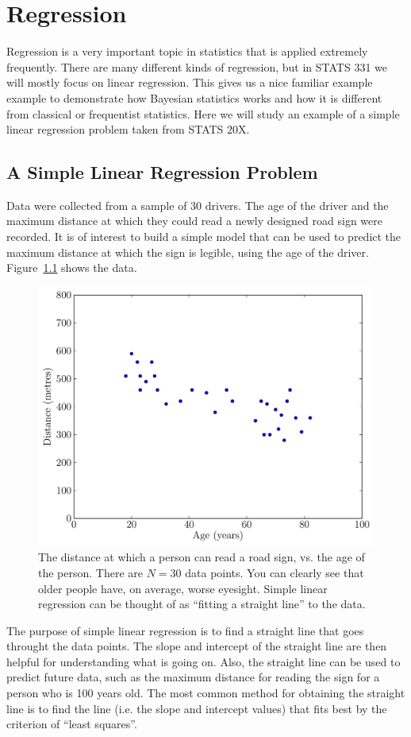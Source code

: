 \chapter{Regression}
Regression is a very important topic in statistics that is applied extremely
frequently. There are many different kinds of regression, but in STATS 331 we will
mostly focus on linear regression. This gives us a nice familiar example
example to demonstrate how Bayesian statistics works and how it is different
from classical or frequentist statistics. Here we will study an example of a
simple linear regression problem taken from STATS 20X.

\section{A Simple Linear Regression Problem}
Data were collected from a sample of 30 drivers. The age of the driver and the 
maximum distance at which they could read a newly designed road sign were 
recorded. It is of interest to build a simple model that can be used to predict the 
maximum distance at which the sign is legible, using the age of the driver.
Figure~\ref{fig:road} shows the data.
\begin{figure}
\begin{center}
\includegraphics[scale=0.5]{Figures/road.pdf}
\caption{The distance at which a person can read a road sign, vs. the age of
the person. There are $N=30$ data points. You can clearly see that older people
have, on average, worse eyesight. Simple linear regression can be thought of as
``fitting a straight line'' to the data.
\label{fig:road}}
\end{center}
\end{figure}
The purpose of simple linear regression is to find a straight line that goes
throught the data points. The slope and intercept of the straight line are then
helpful for understanding what is going on. Also, the straight line can be used
to predict future data, such as the maximum distance for reading the sign for a
person who is 100 years old. The most common method for obtaining the straight
line is to find the line (i.e. the slope and intercept values) that fits best
by the criterion of ``least squares''.

